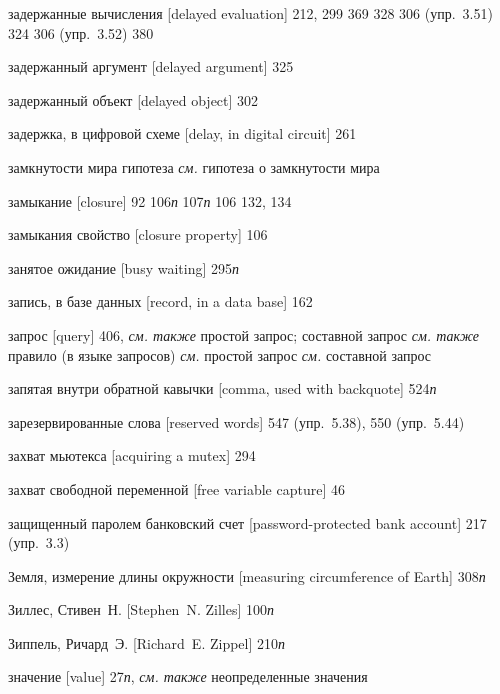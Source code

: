\begin{theindex}
\item {задержанные вычисления [delayed evaluation]} 212, 299
   369
   328
   306 (упр.~3.51)
   324
   306 (упр.~3.52)
   380
\item {задержанный аргумент [delayed argument]} 325
\item {задержанный объект [delayed object]} 302
\item {задержка, в цифровой схеме [delay, in digital circuit]} 261
\item {замкнутости мира гипотеза} {\it см.} гипотеза о замкнутости мира
\item {замыкание [closure]} 92
   106{\it п}
   107{\it п}
   106
   132, 134
\item {замыкания свойство [closure property]} 106
\item {занятое ожидание [busy waiting]} 295{\it п}
\item {запись, в базе данных [record, in a data base]} 162
\item {запрос [query]} 406, {\it см. также} простой запрос; составной запрос
   {\it см. также} правило (в языке запросов)
   {\it см.} простой запрос
   {\it см.} составной запрос
\item {запятая внутри обратной кавычки [comma, used with backquote]} 524{\it п}
\item {зарезервированные слова [reserved words]} 547 (упр.~5.38), 550 (упр.~5.44)
\item {захват мьютекса [acquiring a mutex]} 294
\item {захват свободной переменной [free variable capture]} 46
\item {защищенный паролем банковский счет [password-protected bank account]} 217 (упр.~3.3)
\item {Земля, измерение длины окружности [measuring circumference of Earth]} 308{\it п}
\item {Зиллес, Стивен~Н. [Stephen~N. Zilles]} 100{\it п}
\item {Зиппель, Ричард~Э. [Richard~E. Zippel]} 210{\it п}
\item {значение [value]}
   27{\it п}, {\it см. также} неопределенные значения

\end{theindex}
